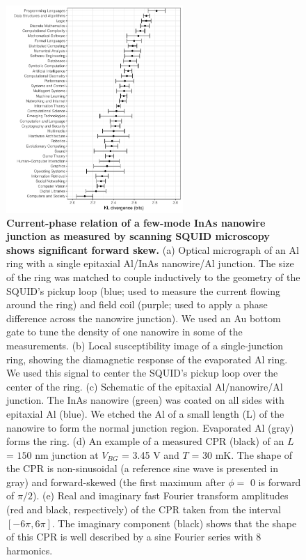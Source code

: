 \documentclass[11pt]{article}
\begin{document}
\begin{figure}[htb]
\centerline{\includegraphics[width=0.6\textwidth]{./fig1.pdf}}
\caption[Current-phase relation of a few-mode InAs nanowire junction as measured by scanning SQUID microscopy shows significant forward skew.]{\label{fig:fig1} \textbf{Current-phase relation of a few-mode InAs nanowire junction as measured by scanning SQUID microscopy shows significant forward skew.} (a) Optical micrograph of an Al ring with a single epitaxial Al/InAs nanowire/Al junction. The size of the ring was matched to couple inductively to the geometry of the SQUID's pickup loop (blue; used to measure the current flowing around the ring) and field coil (purple; used to apply a phase difference across the nanowire junction). We used an Au bottom gate to tune the density of one nanowire in some of the measurements. (b) Local susceptibility image of a single-junction ring, showing the diamagnetic response of the evaporated Al ring. We used this signal to center the SQUID's pickup loop over the center of the ring. (c) Schematic of the epitaxial Al/nanowire/Al junction. The InAs nanowire (green) was coated on all sides with epitaxial Al (blue). We etched the Al of a small length (L) of the nanowire to form the normal junction region. Evaporated Al (gray) forms the ring. (d) An example of a measured CPR (black) of an $L$ = $150$ nm junction at $V_{BG}$ = 3.45 V and $T$ = 30 mK. The shape of the CPR is non-sinusoidal (a reference sine wave is presented in gray) and forward-skewed (the first maximum after $\phi =$ 0 is forward of $\pi / 2$). (e) Real and imaginary fast Fourier transform amplitudes (red and black, respectively) of the CPR taken from the interval $[-6\pi,6\pi]$. The imaginary component (black) shows that the shape of this CPR is well described by a sine Fourier series with 8 harmonics.}
\end{figure}
\end{document}
